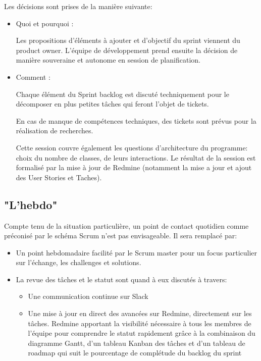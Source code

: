 Les décisions sont prises de la manière suivante:
\begin{itemize}
      \item Quoi et pourquoi :
       
      Les propositions d'éléments à ajouter et d’objectif du sprint viennent du product owner. 
      L'équipe de développement prend ensuite la décision de manière souveraine et autonome 
      en session de planification.
       \item Comment :
       
       Chaque élément du Sprint backlog est discuté techniquement pour le décomposer en plus petites 
       tâches qui feront l’objet de tickets.
       
       En cas de manque de compétences techniques, des tickets sont prévus pour la réalisation de recherches.
       
       Cette session couvre également les questions d’architecture du programme: choix du nombre de classes, 
       de leurs interactions. Le résultat de la session est formalisé par la mise à jour de Redmine 
       (notamment la mise a jour et ajout des User Stories et Taches).

\end{itemize}

\subsection{"L'hebdo"}

Compte tenu de la situation particulière, un point de contact quotidien comme préconisé par 
le schéma Scrum n’est pas envisageable. Il sera remplacé par:
 \begin{itemize}
       \item Un point hebdomadaire facilité par le Scrum master pour un focus particulier sur l'échange,
        les challenges et solutions. 
       \item La revue des tâches et le statut sont quand à eux discutés à travers:
       \begin{itemize}
             \item Une communication continue sur Slack
             \item Une mise à jour en direct des avancées sur Redmine, directement sur les tâches. 
             Redmine apportant la visibilité nécessaire à tous les membres de l'équipe pour comprendre 
             le statut rapidement grâce à la combinaison du diagramme Gantt, d’un tableau Kanban 
             des tâches et d’un tableau de roadmap qui suit le pourcentage de complétude du backlog 
             du sprint

       \end{itemize}
 \end{itemize}


